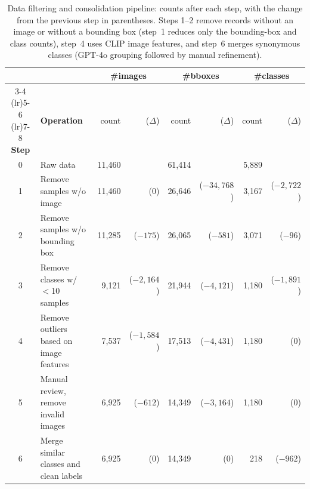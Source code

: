 \begin{table}[tb]
  \centering
  \caption{Data filtering and consolidation pipeline: counts after each step, with the change from the previous step in parentheses. Steps 1--2 remove records without an image or without a bounding box (step~1 reduces only the bounding-box and class counts), step~4 uses CLIP image features, and step~6 merges synonymous classes (GPT-4o grouping followed by manual refinement).}
  \begin{tabular}{@{}cl rr rr rr@{}}
    \toprule
    & & \multicolumn{2}{c}{\textbf{\#images}} & \multicolumn{2}{c}{\textbf{\#bboxes}} & \multicolumn{2}{c}{\textbf{\#classes}} \\
    \cmidrule(lr){3-4} \cmidrule(lr){5-6} \cmidrule(lr){7-8}
    \textbf{Step} & \textbf{Operation} & count & ($\Delta$) & count & ($\Delta$) & count & ($\Delta$) \\
    \midrule
    0 & Raw data                                 & 11,460 &            & 61,414 &                & 5,889 &              \\
    1 & Remove samples w/o image                 & 11,460 & ($0$)      & 26,646 & ($-34{,}768$)  & 3,167 & ($-2{,}722$) \\
    2 & Remove samples w/o bounding box          & 11,285 & ($-175$)   & 26,065 & ($-581$)       & 3,071 & ($-96$)      \\
    3 & Remove classes w/ $<$10 samples          &  9,121 & ($-2{,}164$) & 21,944 & ($-4{,}121$) & 1,180 & ($-1{,}891$) \\
    4 & Remove outliers based on image features  &  7,537 & ($-1{,}584$) & 17,513 & ($-4{,}431$) & 1,180 & ($0$)        \\
    5 & Manual review, remove invalid images     &  6,925 & ($-612$)   & 14,349 & ($-3{,}164$)   & 1,180 & ($0$)        \\
    6 & Merge similar classes and clean labels   &  6,925 & ($0$)      & 14,349 & ($0$)          &   218 & ($-962$)     \\
    \bottomrule
  \end{tabular}
  \label{data cleaning steps table}
\end{table}
